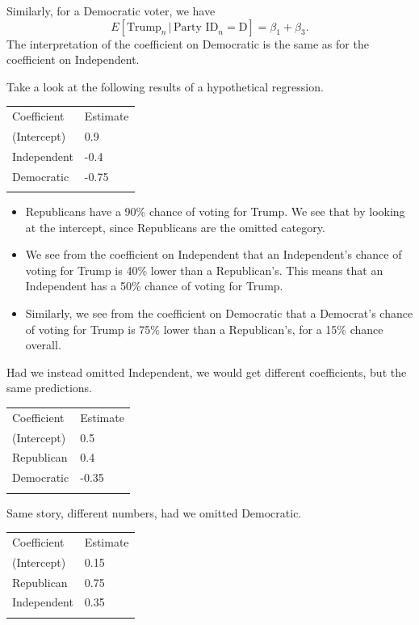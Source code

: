 \documentclass[
  12pt,
  oneside,openany]{book}
\begin{document}
Similarly, for a Democratic voter, we have
\[
E[\text{Trump}_n \,|\, \text{Party ID}_n = \text{D}] = \beta_1 + \beta_3.
\]
The interpretation of the coefficient on Democratic is the same as for the coefficient on Independent.

Take a look at the following results of a hypothetical regression.

\begin{longtable}[]{@{}ll@{}}
\toprule
Coefficient & Estimate \\ \addlinespace
\midrule
\endhead
(Intercept) & 0.9 \\ \addlinespace
Independent & -0.4 \\ \addlinespace
Democratic & -0.75 \\ \addlinespace
\bottomrule
\end{longtable}

\begin{itemize}
\item
  Republicans have a 90\% chance of voting for Trump. We see that by looking at the intercept, since Republicans are the omitted category.
\item
  We see from the coefficient on Independent that an Independent's chance of voting for Trump is 40\% lower than a Republican's. This means that an Independent has a 50\% chance of voting for Trump.
\item
  Similarly, we see from the coefficient on Democratic that a Democrat's chance of voting for Trump is 75\% lower than a Republican's, for a 15\% chance overall.
\end{itemize}

Had we instead omitted Independent, we would get different coefficients, but the same predictions.

\begin{longtable}[]{@{}ll@{}}
\toprule
Coefficient & Estimate \\ \addlinespace
\midrule
\endhead
(Intercept) & 0.5 \\ \addlinespace
Republican & 0.4 \\ \addlinespace
Democratic & -0.35 \\ \addlinespace
\bottomrule
\end{longtable}

Same story, different numbers, had we omitted Democratic.

\begin{longtable}[]{@{}ll@{}}
\toprule
Coefficient & Estimate \\ \addlinespace
\midrule
\endhead
(Intercept) & 0.15 \\ \addlinespace
Republican & 0.75 \\ \addlinespace
Independent & 0.35 \\ \addlinespace
\bottomrule
\end{longtable}
\end{document}
